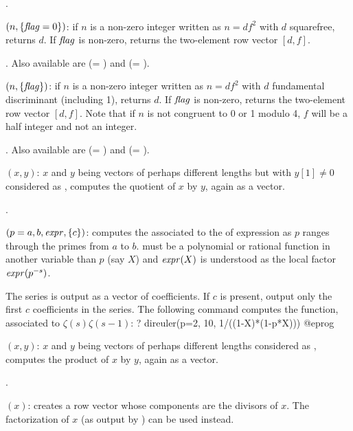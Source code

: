 .

$(n,\{\hbox{\it f\kern0pt lag\/}=0\})$: if $n$ is a non-zero integer written as
$n=df^2$ with $d$ squarefree, returns $d$. If $\hbox{\it f\kern0pt lag\/}$ is non-zero,
returns the two-element row vector $[d,f]$.

.
Also available are  (= ) and 
(= ).

$(n,\{\hbox{\it f\kern0pt lag\/}\})$: if $n$ is a non-zero integer written as
$n=df^2$ with $d$ fundamental discriminant (including 1), returns $d$. If
$\hbox{\it f\kern0pt lag\/}$ is non-zero, returns the two-element row vector $[d,f]$. Note that if
$n$ is not congruent to 0 or 1 modulo 4, $f$ will be a half integer and not
an integer.

.
Also available are
 (= ) and
 (= ).

$(x,y)$: $x$ and $y$ being vectors of perhaps different
lengths but with $y[1]\neq 0$ considered as , computes
the quotient of $x$ by $y$, again as a vector.

.

$(p=a,b,\hbox{\it expr\/},\{c\})$: computes the
 associated to the  of
expression  as $p$ ranges through the primes from $a$ to $b$.
 must be a polynomial or rational function in another variable
than $p$ (say $X$) and $\hbox{\it expr\/}(X)$ is understood as
the local factor $\hbox{\it expr\/}(p^{-s})$.

The series is output as a vector of coefficients. If $c$ is present, output
only the first $c$ coefficients in the series. The following command computes
the  function, associated to $\zeta(s)\zeta(s-1)$:
\bprog
? direuler(p=2, 10, 1/((1-X)*(1-p*X)))
@eprog


$(x,y)$: $x$ and $y$ being vectors of perhaps different
lengths considered as , computes the product of
$x$ by $y$, again as a vector.

.

$(x)$: creates a row vector whose components are the
divisors of $x$. The factorization of $x$ (as output by ) can
be used instead.

